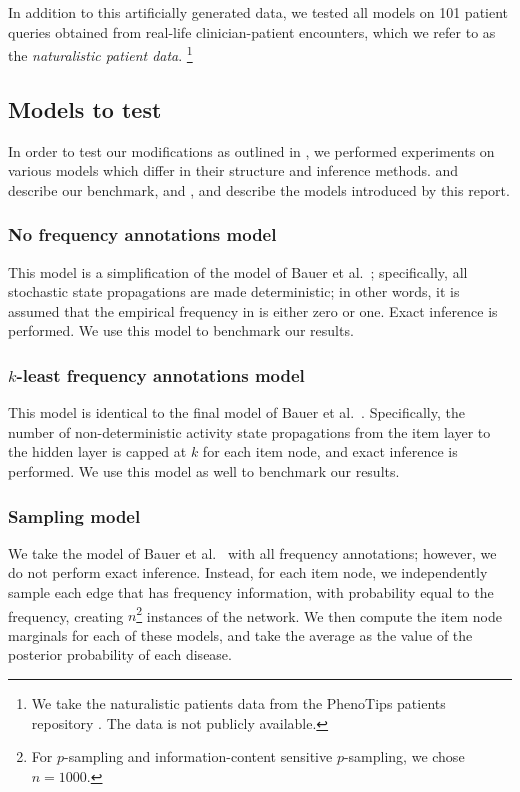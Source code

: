 In addition to this artificially generated data, we tested all models
on 101 patient queries obtained from real-life clinician-patient
encounters, which we refer to as the {\it naturalistic patient data}.
%
\footnote{
    We take the naturalistic patients data from the PhenoTips patients
    repository \cite{phenotips}.
    The data is not publicly available.
}

\subsection{Models to test}
%
In order to test our modifications as outlined in ,
we performed experiments on various models which differ in their structure and
inference methods.
%
 and 
 describe our benchmark, and
, 
 and 
 describe the models introduced by this report.

\subsubsection{No frequency annotations model}
\label{subsubsec:nofreqmodel}
%
This model is a simplification of the model of Bauer et al.\
\cite{bauer2012bayesian}; specifically, all stochastic state propagations are
made deterministic; in other words, it is assumed that the empirical frequency
in 
 is either zero or one.
%
Exact inference is performed.
%
We use this model to benchmark our results.

\subsubsection{$k$-least frequency annotations model}
\label{subsubsec:kleastmodel}
%
This model is identical to the final model of Bauer et al.\
\cite{bauer2012bayesian}. Specifically, the number of non-deterministic activity
state propagations from the item layer to the hidden layer is capped at $k$ for
each item node, and exact inference is performed.
%
We use this model as well to benchmark our results.

\subsubsection{Sampling model}
\label{subsubsec:sampmodel}
%
We take the model of Bauer et al.\ \cite{bauer2012bayesian} with all frequency
annotations; however, we do not perform exact inference.
%
Instead, for each item node, we independently sample each edge that has frequency
information, with probability equal to the frequency, creating $n$\footnote{
    For $p$-sampling and information-content sensitive $p$-sampling, we chose $n=1000$.
} instances of the network.
%
We then compute the item node marginals for each of these models, and take
the average as the value of the posterior probability of each disease. 

